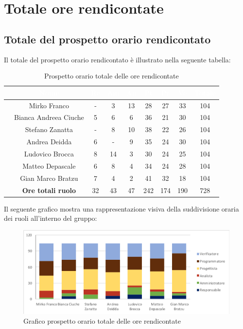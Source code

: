\section{Totale ore rendicontate}
\subsection{Totale del  prospetto orario rendicontato}
Il totale del prospetto orario rendicontato è illustrato nella seguente tabella:

\begin{table}[ht]
	\begin{center}
		\begin{tabular}{ccccccccc}
			\rowcolor{coolblack}
			\hline
			& \textcolor{white}{Nome} & \textcolor{white}{Re} & \textcolor{white}{Am} & \textcolor{white}{An} & \textcolor{white}{Pt} &\textcolor{white}{Pr} & \textcolor{white}{Ve} & \textcolor{white}{Totale} \\
			\hline
			&Mirko Franco & - & 3 & 13 & 28& 27 & 33 & 104  \\
			&Bianca Andreea Ciuche & 5& 6& 6 & 36 & 21& 30 &104 \\
			&Stefano Zanatta & -& 8& 10 & 38 & 22 & 26 & 104 \\
			&Andrea Deidda &  6& - & 9 &35 & 24 & 30 & 104\\
			&Ludovico Brocca & 8& 14 & 3 & 30 & 24 & 25 & 104 \\
			&Matteo Depascale & 6& 8& 4 & 34& 24& 28& 104\\
			&Gian Marco Bratzu & 7& 4 & 2 & 41 & 32 & 18 &104\\
			\hline
			&\textbf{Ore totali ruolo} & 32& 43 & 47 & 242 & 174 & 190 & 728 \\
		\end{tabular}
		\caption{Prospetto orario totale delle ore rendicontate}
	\end{center}
\end{table}


Il seguente grafico mostra una rappresentazione visiva della suddivisione oraria dei ruoli all'interno del gruppo:
\begin{figure}[!ht]
	\begin{center}
		\includegraphics[scale=0.90]{images/grafoOreRendicontate.png}
		\caption{Grafico prospetto orario totale delle ore rendicontate}
	\end{center}
\end{figure}

